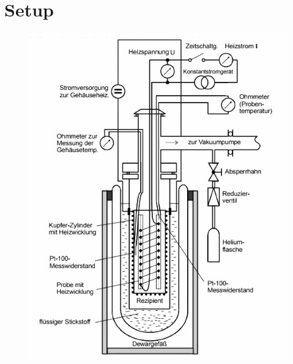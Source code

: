 \section{Setup}
\label{sec:setup}

\begin{figure}[H]
	\centering
	\includegraphics[width=0.6\linewidth]{content/graphics/equipment.jpg}
	\caption{\cite{molar_heat}}
	\label{fig:equipment}
\end{figure}
